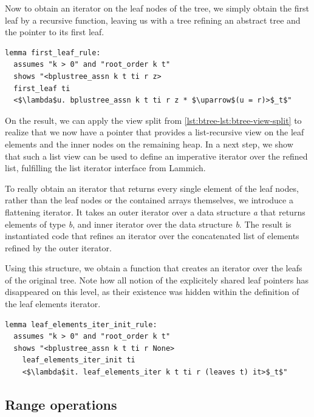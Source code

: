 \documentclass[a4paper,UKenglish,cleveref, autoref, thm-restate]{lipics-v2021}
\begin{document}
Now to obtain an iterator on the leaf nodes of the tree,
we simply obtain the first leaf by a recursive function, leaving
us with a tree refining an abstract tree and the pointer to its first leaf.

\begin{lstlisting}[mathescape=true, language=Isabelle,label=lst:btree-first-leaf]
lemma first_leaf_rule:
  assumes "k > 0" and "root_order k t"
  shows "<bplustree_assn k t ti r z>
  first_leaf ti
  <$\lambda$u. bplustree_assn k t ti r z * $\uparrow$(u = r)>$_t$"
\end{lstlisting}


On the result, we can apply the view split from \autoref{lst:btree-lst:btree-view-split}
to realize that we now have a pointer that provides a list-recursive
view on the leaf elements and the inner nodes on the remaining heap.
In a next step, we show that such a list view can be used
to define an imperative iterator over the refined list,
fulfilling the list iterator interface from Lammich. \cite{DBLP:conf/itp/Lammich19}

To really obtain an iterator that returns every single element of the
leaf nodes, rather than the leaf nodes or the contained arrays themselves,
we introduce a flattening iterator.
It takes an outer iterator over a data structure \textit{a} that returns elements of type \textit{b},
and inner iterator over the data structure \textit{b}.
The result is instantiated code that refines an iterator
over the concatenated list of elements refined by the outer iterator.

Using this structure, we obtain a function that creates an iterator
over the leafs of the original tree.
Note how all notion of the explicitely shared leaf pointers
has disappeared on this level, as their existence was hidden within the definition
of the leaf elements iterator.

\begin{lstlisting}[mathescape=true, language=Isabelle,label=lst:btree-view-split]
lemma leaf_elements_iter_init_rule:
  assumes "k > 0" and "root_order k t"
  shows "<bplustree_assn k t ti r None>
    leaf_elements_iter_init ti
    <$\lambda$it. leaf_elements_iter k t ti r (leaves t) it>$_t$"
\end{lstlisting}

\subsection{Range operations}
\label{sec:imperative_range}
\end{document}
